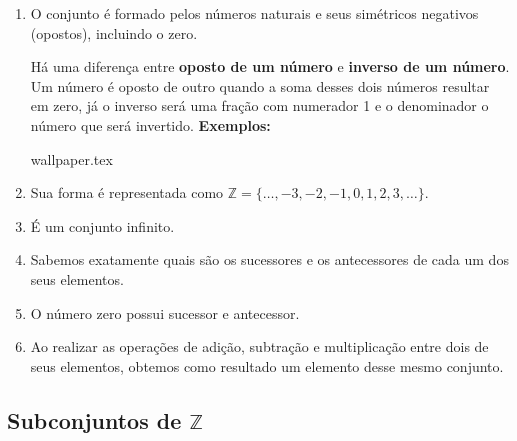 \documentclass[10pt]{article}
\begin{document}
    \begin{enumerate}[label=\textbf{(\Roman*)}]
        \item O conjunto é formado pelos números naturais e seus simétricos negativos (opostos), incluindo o zero.
            \begin{obs}
                Há uma diferença entre \textbf{oposto de um número} e \textbf{inverso de um número}. Um número é oposto de outro quando a soma desses dois números resultar em zero, já o inverso será uma fração com numerador 1 e o denominador o número que será invertido.
                \textbf{Exemplos:}
                \begin{enumerate}
                \end{enumerate}
            \end{obs}
\newpage
{wallpaper.tex} %
        \item Sua forma é representada como \( \mathbb{Z} = \{\ldots, -3, -2, -1, 0, 1, 2, 3, \ldots\}\).
        \item É um conjunto infinito.
        \item Sabemos exatamente quais são os sucessores e os antecessores de cada um dos seus elementos.
        \item O número zero possui sucessor e antecessor.
        \item Ao realizar as operações de adição, subtração e multiplicação entre dois de seus elementos, obtemos como resultado um elemento desse mesmo conjunto.
    \end{enumerate}
\subsection*{Subconjuntos de \( \mathbb{Z} \)}
\end{document}
